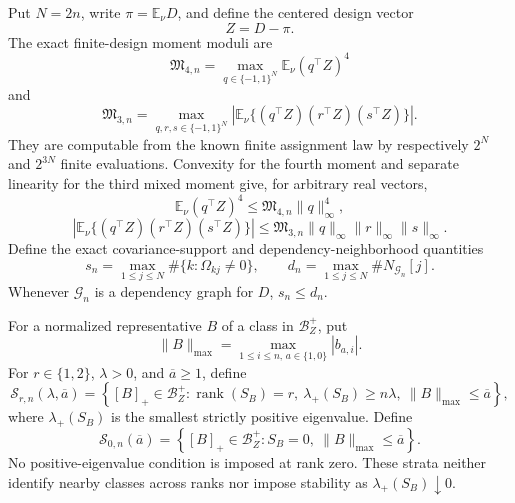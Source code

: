 Put \(N=2n\), write \(\pi=\mathbb E_\nu D\), and define the centered design vector
\[
Z=D-\pi.
\]
The exact finite-design moment moduli are
\[
\mathfrak M_{4,n}
=\max_{q\in\{-1,1\}^{N}}\mathbb E_\nu(q^{\top}Z)^4
\]
and
\[
\mathfrak M_{3,n}
=\max_{q,r,s\in\{-1,1\}^{N}}
\left|\mathbb E_\nu\{(q^{\top}Z)(r^{\top}Z)(s^{\top}Z)\}\right|.
\]
They are computable from the known finite assignment law by respectively \(2^N\) and \(2^{3N}\) finite evaluations.  Convexity for the fourth moment and separate linearity for the third mixed moment give, for arbitrary real vectors,
\[
\mathbb E_\nu(q^{\top}Z)^4
\le\mathfrak M_{4,n}\lVert q\rVert_\infty^4,
\]
\[
\left|\mathbb E_\nu\{(q^{\top}Z)(r^{\top}Z)(s^{\top}Z)\}\right|
\le\mathfrak M_{3,n}\lVert q\rVert_\infty
\lVert r\rVert_\infty\lVert s\rVert_\infty.
\]
Define the exact covariance-support and dependency-neighborhood quantities
\[
s_n=\max_{1\le j\le N}\#\{k:\Omega_{kj}\ne0\},
\qquad
d_n=\max_{1\le j\le N}\#N_{\mathcal G_n}[j].
\]
Whenever \(\mathcal G_n\) is a dependency graph for \(D\), \(s_n\le d_n\).

For a normalized representative \(B\) of a class in \(\mathcal B_Z^+\), put
\[
\lVert B\rVert_{\max}
=\max_{1\le i\le n,\,a\in\{1,0\}}|b_{a,i}|.
\]
For \(r\in\{1,2\}\), \(\lambda>0\), and \(\overline a\ge1\), define
\[
\mathcal S_{r,n}(\lambda,\overline a)
=\left\{[B]_+\in\mathcal B_Z^+:
\operatorname{rank}(S_B)=r,\ 
\lambda_+(S_B)\ge n\lambda,\ 
\lVert B\rVert_{\max}\le\overline a\right\},
\]
where \(\lambda_+(S_B)\) is the smallest strictly positive eigenvalue.  Define
\[
\mathcal S_{0,n}(\overline a)
=\left\{[B]_+\in\mathcal B_Z^+:S_B=0,\ 
\lVert B\rVert_{\max}\le\overline a\right\}.
\]
No positive-eigenvalue condition is imposed at rank zero.  These strata neither identify nearby classes across ranks nor impose stability as \(\lambda_+(S_B)\downarrow0\).
